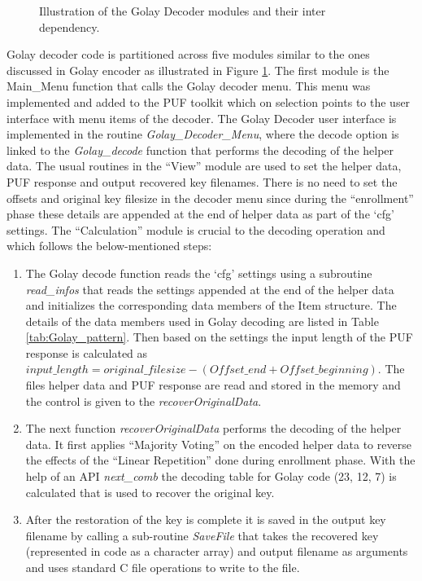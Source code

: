 	\begin{figure}[h]
	\centering
	\caption{Illustration of the Golay Decoder modules and their inter dependency.}
	\label{img:golay_decoder_fns}
	\end{figure}

	Golay decoder code is partitioned across five modules similar to the ones discussed in Golay encoder as illustrated in Figure \ref{img:golay_decoder_fns}. The first module is the Main\_Menu function that calls the Golay decoder menu. This menu was implemented and added to the PUF toolkit which on selection points to the user interface with menu items of the decoder. The Golay Decoder user interface is implemented in the routine \emph{Golay\_Decoder\_Menu}, where the decode option is linked to the \emph{Golay\_decode}
	function that performs the decoding of the helper data. The usual routines in the ``View'' module are used to set the helper data, PUF response and output recovered key filenames. There is no need to set the offsets and original key filesize in the decoder menu since during the ``enrollment'' phase these details are appended at the end of helper data as part of the `cfg' settings. The ``Calculation'' module is crucial to the decoding operation and which follows the below-mentioned
	steps:
	\begin{enumerate}
		\item The Golay decode function reads the `cfg' settings using a subroutine \emph{read\_infos} that reads the settings appended at the end of the helper data and initializes the corresponding data members of the Item structure. The details of the data members used in Golay decoding are listed in Table \ref{tab:Golay_pattern}. Then based on the settings the input length of the PUF response is calculated as $input\_length = original\_filesize - (Offset\_end + Offset\_beginning)$. The files helper data and PUF response are read and stored in the memory and the control is given to the \emph{recoverOriginalData}.
		\item The next function \emph{recoverOriginalData} performs the decoding of the helper data. It first applies ``Majority Voting'' on the encoded helper data to reverse the effects of the ``Linear Repetition'' done during enrollment phase. With the help of an API \emph{next\_comb} the decoding table for Golay code (23, 12, 7) is calculated that is used to recover the original key.
		\item After the restoration of the key is complete it is saved in the output key filename by calling a
			sub-routine \emph{SaveFile} that takes the recovered key (represented in code as a character array) and output filename as arguments and uses standard C file operations to write to the file.
	\end{enumerate}

